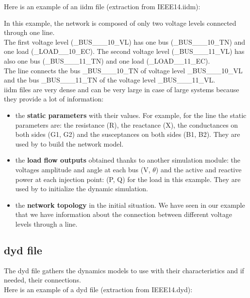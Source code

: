 \documentclass[a4paper, 12pt]{report}
\begin{document}
Here is an example of an iidm file (extraction from IEEE14.iidm):


In this example, the network is composed of only two voltage levels connected through one line. \\

The first voltage level (\_BUS\_\_\_10\_VL) has one bus (\_BUS\_\_\_10\_TN) and one load (\_LOAD\_\_10\_EC). The second voltage level (\_BUS\_\_\_11\_VL) has also one bus (\_BUS\_\_\_11\_TN) and one load (\_LOAD\_\_11\_EC). \\

The line connects the bus \_BUS\_\_\_10\_TN of voltage level \_BUS\_\_\_10\_VL and the bus \_BUS\_\_\_11\_TN of the voltage level \_BUS\_\_\_11\_VL. \\

iidm files are very dense and can be very large in case of large systems because they provide a lot of information:
\begin{itemize}
\item the \textbf{static parameters} with their values. For example, for the line the static parameters are: the resistance (R), the reactance (X), the conductances on both sides (G1, G2) and the susceptances on both sides (B1, B2).  They are used by \Dynawo to build the network model.
\item the \textbf{load flow outputs} obtained thanks to another simulation module: the voltages amplitude and angle at each bus (V, $\theta$) and the active and reactive power at each injection point: (P, Q) for the load in this example. They are used by \Dynawo to initialize the dynamic simulation.
\item the \textbf{network topology} in the initial situation. We have seen in our example that we have information about the connection between different voltage levels through a line.
\end{itemize}

\subsection{dyd file}

The dyd file gathers the dynamics models to use with their characteristics and if needed, their connections. \\

Here is an example of a dyd file (extraction from IEEE14.dyd):

\end{document}

